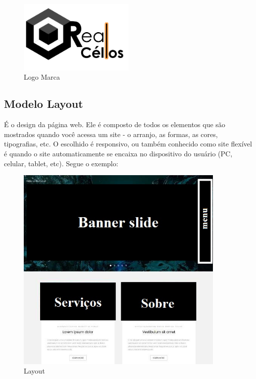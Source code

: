 \documentclass[
	12pt,				%
    oneside,			%
	a4paper,			%
	english,			%
	french,				%
	spanish,			%
	brazil,				%
	]{abntex2}
\begin{document}
\begin{figure}[!h]
\center
\includegraphics[width=0.5\textwidth]{logo.png}
\caption{Logo Marca}
\end{figure}

\subsection{Modelo Layout}

 É o design da página web. Ele é composto de todos os elementos que são mostrados quando você acessa um site - o arranjo, as formas, as cores, tipografias, etc. O escolhido é responsivo, ou também conhecido como site flexível é quando o site automaticamente se encaixa no dispositivo do usuário (PC, celular, tablet, etc). Segue o exemplo:\\
 
 \begin{figure}[!h]
\center
\includegraphics[width=0.9\textwidth]{hielo.jpg}
\caption{Layout}
\end{figure}
\end{document}
